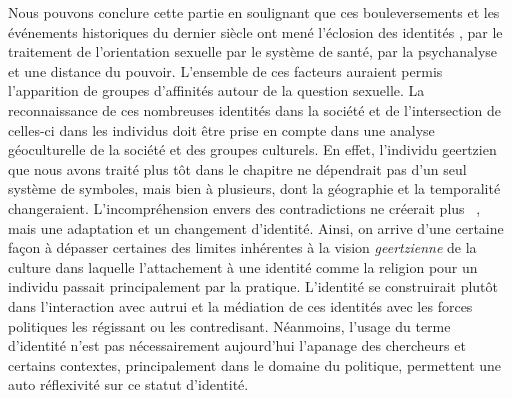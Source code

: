 Nous pouvons conclure cette partie en soulignant que ces bouleversements et les événements historiques du dernier siècle ont mené l'éclosion des identités \lgbt{}, par le traitement de l'orientation sexuelle par le système de santé, par la psychanalyse et une distance du pouvoir.
L'ensemble de ces facteurs auraient permis l'apparition de groupes d'affinités autour de la question sexuelle. 
La reconnaissance de ces nombreuses identités dans la société et de l'intersection de celles-ci dans les individus doit être prise en compte dans une analyse géoculturelle de la société et des groupes culturels.
En effet, l'individu geertzien que nous avons traité plus tôt dans le chapitre ne  dépendrait pas d'un seul système de symboles, mais bien à plusieurs, dont la géographie et la temporalité changeraient.
L'incompréhension envers des contradictions ne créerait plus ~\citep[33]{Geertz1972}, mais une adaptation et un changement d'identité.
Ainsi, on arrive d'une certaine façon à dépasser certaines des limites inhérentes à la vision \emph{geertzienne} de la culture dans laquelle l'attachement à une identité comme la religion pour un individu passait principalement par la pratique.
L'identité se construirait plutôt dans l'interaction avec autrui et la médiation de ces identités avec les forces politiques les régissant ou les contredisant.
Néanmoins, l'usage du terme d'identité n'est pas nécessairement aujourd'hui l'apanage des chercheurs et certains contextes, principalement dans le domaine du politique, permettent une auto réflexivité sur ce statut d'identité.

